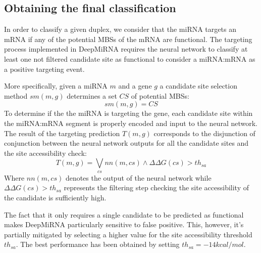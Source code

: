 \subsection{Obtaining the final classification}
In order to classify a given duplex, we consider that the miRNA targets an mRNA if any of the potential MBSs of the mRNA are functional. The targeting process implemented in DeepMiRNA requires the neural network to classify at least one not filtered candidate site as functional to consider a miRNA:mRNA as a positive targeting event.

More specifically, given a miRNA $m$ and a gene $g$ a candidate site selection method $sm(m,g)$ determines a set $CS$ of potential MBSs:
%
\begin{equation} \label{eq:eq1}
	sm(m,g) = CS
\end{equation}
To determine  if the the miRNA is targeting the gene, each candidate site within the miRNA:mRNA segment is properly encoded and input to the neural network. The result of the targeting prediction $T(m, g)$ corresponds to the disjunction of conjunction between the neural network outputs for all the candidate sites and the site accessibility check:
%
\begin{equation} \label{eq:eq2}
	T(m,g) = \bigvee_{cs}{nn(m,cs) \wedge \Delta\Delta G(cs) > th_{sa}}
\end{equation} 
%
Where $nn(m,cs)$ denotes the output of the neural network while $\Delta\Delta G(cs) > th_{sa}$ represents the filtering step checking the site accessibility of the candidate is sufficiently high.

The fact that it only requires a single candidate to be predicted as functional makes DeepMiRNA particularly sensitive to false positive. This, however, it's partially mitigated by selecting a higher value for the site accessibility threshold $th_{sa}$. The best performance has been obtained by setting $th_{sa} = -14kcal/mol$.



